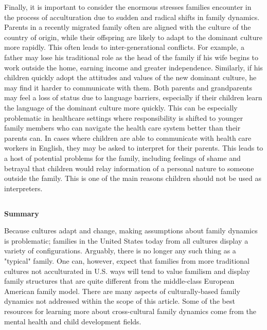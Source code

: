 \documentclass[12pt]{article}
\begin{document}
\begin{spacing}{1.5}
{			Finally, it is important to consider the enormous stresses families encounter in the process of acculturation due to sudden and radical shifts in family dynamics. Parents in a recently migrated family often are aligned with the culture of the country of origin, while their offspring are likely to adapt to the dominant culture more rapidly. This often leads to inter-generational conflicts. For example, a father may lose his traditional role as the head of the family if his wife begins to work outside the home, earning income and greater independence. Similarly, if his children quickly adopt the attitudes and values of the new dominant culture, he may find it harder to communicate with them. Both parents and grandparents may feel a loss of status due to language barriers, especially if their children learn the language of the dominant culture more quickly. This can be especially problematic in healthcare settings where responsibility is shifted to younger family members who can navigate the health care system better than their parents can. In cases where children are able to communicate with health care workers in English, they may be asked to interpret for their parents. This leads to a host of potential problems for the family, including feelings of shame and betrayal that children would relay information of a personal nature to someone outside the family. This is one of the main reasons children should not be used as interpreters.
			
			\subsection{}
			\textbf{Summary}
			
			Because cultures adapt and change, making assumptions about family dynamics is problematic; families in the United States today from all cultures display a variety of configurations. Arguably, there is no longer any such thing as a "typical" family. One can, however, expect that families from more traditional cultures not acculturated in U.S. ways will tend to value familism and display family structures that are quite different from the middle-class European American family model. There are many aspects of culturally-based family dynamics not addressed within the scope of this article. Some of the best resources for learning more about cross-cultural family dynamics come from the mental health and child development fields.
								
		}
	\end{spacing}
	
\end{document}
